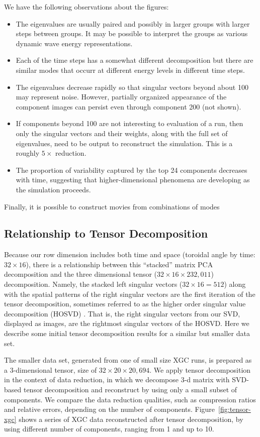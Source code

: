 We have the following observations about the figures:
\begin{itemize}
\item The eigenvalues are usually paired and possibly in larger groups
  with larger steps between groups. It may be possible to interpret
  the groups as various dynamic wave energy representations.
\item Each of the time steps has a somewhat different decomposition
  but there are similar modes that occurr at different energy levels in
  different time steps.
\item The eigenvalues decrease rapidly so that singular vectors beyond
  about 100 may represent noise. However, partially organized
  appearance of the component images can persist even through
  component 200 (not shown).
\item If components beyond 100 are not interesting to evaluation of a
  run, then only the singular vectors and their weights, along with
  the full set of eigenvalues, need to be output to reconstruct the
  simulation. This is a roughly $5\times$ reduction.
\item The proportion of variability captured by the top 24 components
  decreases with time, suggesting that higher-dimensional phenomena
  are developing as the simulation proceeds.
\end{itemize}
Finally, it is possible to construct movies from combinations of modes 

\subsection{Relationship to Tensor Decomposition}
Because our row dimension includes both time and space (toroidal angle
by time: $32\times 16$), there is a relationship between this
``stacked'' matrix PCA decomposition and the three dimensional tensor
($32\times 16\times 232,011$) decomposition. Namely, the stacked left
singular vectors ($32\times 16 = 512$) along with the spatial patterns
of the right singular vectors are the first iteration of the tensor
decomposition, sometimes referred to as the higher order singular
value decomposition (HOSVD) \cite[p.1264]{DeLathauwer2000}. That is,
the right singular vectors from our SVD, displayed as images, are the
rightmost singular 
vectors of the HOSVD. Here we describe some initial tensor
decomposition results for a similar but smaller data set.

The smaller data set, generated from one of small size XGC runs, is prepared as a 3-dimensional tensor, size of  $32\times20\times20,694$. We apply tensor decomposition in the context of data reduction, in which we decompose 3-d matrix with SVD-based tensor decomposition and reconstruct by using only a small subset of components. We compare the data reduction qualities, such as compression ratios and relative errors, depending on the number of components. Figure~\ref{fig:tensor-xgc} shows a series of XGC data reconstructed after tensor decomposition, by using different number of components, ranging from 1 and up to 10.

